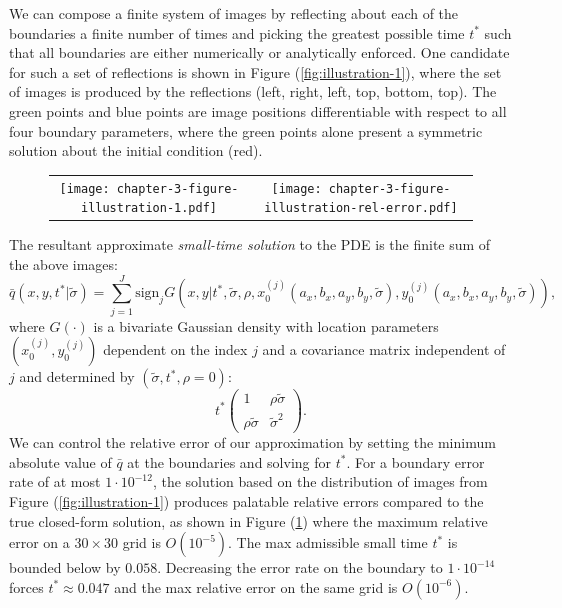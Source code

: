 \documentclass[10pt]{article}
\begin{document}
We can compose a finite system of images by reflecting about each of
the boundaries a finite number of times and picking the greatest
possible time $t^{*}$ such that all boundaries are either numerically
or analytically enforced. One candidate for such a set of reflections
is shown in Figure (\ref{fig:illustration-1}), where the set of images
is produced by the reflections (left, right, left, top, bottom,
top). The green points and blue points are image positions
differentiable with respect to all four boundary parameters, where the
green points alone present a symmetric solution about the initial
condition (red).

\begin{figure}
  \begin{tabular}{cc}
    \begin{minipage}{0.40\textwidth}
      \centering
      \texttt{[image: chapter-3-figure-illustration-1.pdf]}
      \caption{}
      \label{fig:illustration-1}
    \end{minipage}
    & \begin{minipage}{0.40\textwidth}
      \centering
      \texttt{[image: chapter-3-figure-illustration-rel-error.pdf]}
      \caption{}
      \label{fig:illustration-rel-error}
    \end{minipage}
      \end{tabular}
\end{figure}
The resultant approximate \textit{small-time solution} to the PDE is
the finite sum of the above images:
\[
  \bar{q}(x, y, t^{*}|\tilde{\sigma}) = \sum_{j=1}^J \mbox{sign}_j
  G(x,y|t^*, \tilde{\sigma}, \rho, x_0^{(j)}(a_x, b_x, a_y, b_y, \tilde{\sigma}),
  y_0^{(j)}(a_x, b_x, a_y, b_y, \tilde{\sigma})),
\]
where $G(\cdot)$ is a bivariate Gaussian density with location
parameters $(x^{(j)}_0,y^{(j)}_0)$ dependent on the index $j$ and a
covariance matrix independent of $j$ and determined by
$(\tilde{\sigma}, t^*, \rho = 0)$:
\[
  t^{*} \left( \begin{array}{cc}
                 1 & \rho\tilde{\sigma} \\
                 \rho\tilde{\sigma} & \tilde{\sigma}^2
               \end{array} \right).
\]
We can control the relative error of our approximation by setting the
minimum absolute value of $\bar{q}$ at the boundaries and solving for
$t^{*}$. For a boundary error rate of at most $1 \cdot 10^{-12}$, the
solution based on the distribution of images from Figure
(\ref{fig:illustration-1}) produces palatable relative errors compared
to the true closed-form solution, as shown in Figure
(\ref{fig:illustration-rel-error}) where the maximum relative error on
a $30 \times 30$ grid is $O(10^{-5})$. The max admissible small time
$t^*$ is bounded below by $0.058$. Decreasing the error rate on the
boundary to $1 \cdot 10^{-14}$ forces $t^* \approx 0.047$ and the max
relative error on the same grid is $O(10^{-6})$.
\end{document}

